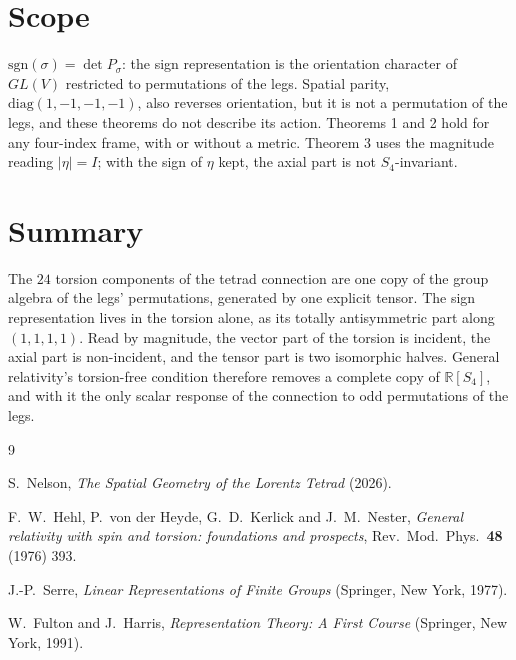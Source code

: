 \documentclass[twocolumn]{iopjournal}
\newcommand{\sgn}{\mathrm{sgn}}
\begin{document}

\section*{Scope}

$\sgn(\sigma) = \det P_\sigma$: the sign representation is the
orientation character of $GL(V)$ restricted to permutations of the
legs. Spatial parity, $\mathrm{diag}(1,-1,-1,-1)$, also reverses
orientation, but it is not a permutation of the legs, and these
theorems do not describe its action. Theorems 1 and 2 hold for any
four-index frame, with or without a metric. Theorem 3 uses the
magnitude reading $|\eta| = I$; with the sign of $\eta$ kept, the
axial part is not $S_4$-invariant.


\section*{Summary}

The $24$ torsion components of the tetrad connection are one copy
of the group algebra of the legs' permutations, generated by one
explicit tensor. The sign representation lives in the torsion alone,
as its totally antisymmetric part along $(1,1,1,1)$. Read by
magnitude, the vector part of the torsion is incident, the axial
part is non-incident, and the tensor part is two isomorphic halves.
General relativity's torsion-free condition therefore removes a
complete copy of $\mathbb{R}[S_4]$, and with it the only scalar
response of the connection to odd permutations of the legs.


\enlargethispage{2\baselineskip}
\begin{thebibliography}{9}

S.~Nelson,
\textit{The Spatial Geometry of the Lorentz Tetrad} (2026).

F.~W.~Hehl, P.~von der Heyde, G.~D.~Kerlick and J.~M.~Nester,
\textit{General relativity with spin and torsion: foundations and
prospects},
Rev.\ Mod.\ Phys.\ \textbf{48} (1976) 393.

J.-P.~Serre,
\textit{Linear Representations of Finite Groups}
(Springer, New York, 1977).

W.~Fulton and J.~Harris,
\textit{Representation Theory: A First Course}
(Springer, New York, 1991).

\end{thebibliography}
\end{document}
